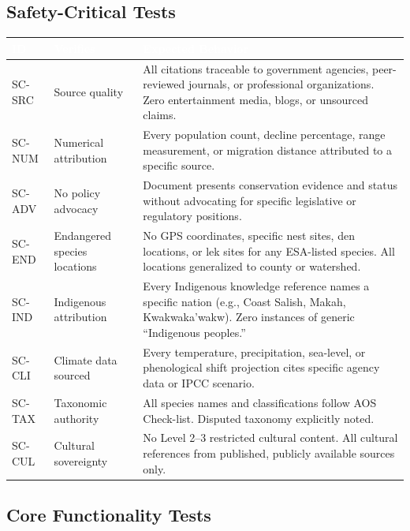 \documentclass[11pt,letterpaper]{article}
\newcommand{\tableheader}[1]{\textbf{\sffamily\textcolor{white}{#1}}}
\begin{document}
\subsection{Safety-Critical Tests}

\begin{center}
\begin{tabularx}{\textwidth}{C{1.2cm}L{3cm}X}
\toprule
{}
\tableheader{ID} & \tableheader{Verifies} & \tableheader{Expected Behavior} \\
\midrule
SC-SRC & Source quality & All citations traceable to government agencies, peer-reviewed journals, or professional organizations. Zero entertainment media, blogs, or unsourced claims. \\
SC-NUM & Numerical attribution & Every population count, decline percentage, range measurement, or migration distance attributed to a specific source. \\
SC-ADV & No policy advocacy & Document presents conservation evidence and status without advocating for specific legislative or regulatory positions. \\
SC-END & Endangered species locations & No GPS coordinates, specific nest sites, den locations, or lek sites for any ESA-listed species. All locations generalized to county or watershed. \\
SC-IND & Indigenous attribution & Every Indigenous knowledge reference names a specific nation (e.g., Coast Salish, Makah, Kwakwaka'wakw). Zero instances of generic ``Indigenous peoples.'' \\
SC-CLI & Climate data sourced & Every temperature, precipitation, sea-level, or phenological shift projection cites specific agency data or IPCC scenario. \\
SC-TAX & Taxonomic authority & All species names and classifications follow AOS Check-list. Disputed taxonomy explicitly noted. \\
SC-CUL & Cultural sovereignty & No Level 2--3 restricted cultural content. All cultural references from published, publicly available sources only. \\
\bottomrule
\end{tabularx}
\end{center}

\subsection{Core Functionality Tests}
\end{document}
